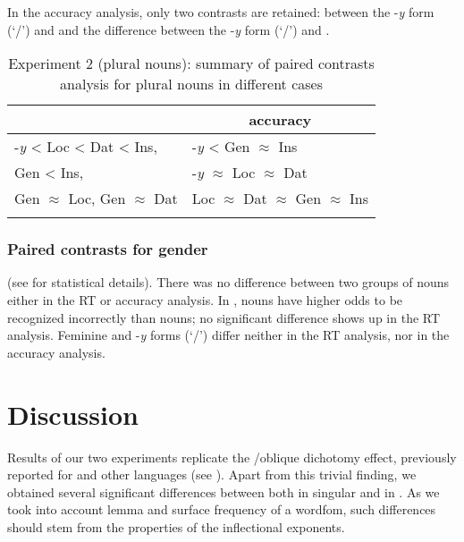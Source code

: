 \documentclass[output=paper, modfonts,newtxmath,hidelinks]{langscibook}
\begin{document}
In the accuracy analysis, only two contrasts are retained: between the -\textit{y} form (`\nomm/\accc') and  and the difference between the -\textit{y} form (`\nomm/\accc') and .

\begin{table}
    \centering
	\caption{Experiment 2 (plural nouns): summary of paired contrasts analysis for plural nouns in different cases}
    \label{tab:casePlHierarchy}
    \begin{tabular}{*{2}l}
    \lsptoprule
    \multicolumn{1}{c}{RTs}	&	\multicolumn{1}{c}{accuracy}\\
    \midrule
    -\textit{y}	< Loc < Dat < Ins,	&	-\textit{y} < Gen $\approx$ Ins \\
    Gen < Ins,	&	-\textit{y} $\approx$ Loc $\approx$ Dat\\
    Gen $\approx$ Loc, Gen $\approx$ Dat & Loc $\approx$	Dat $\approx$ Gen $\approx$  Ins\\
    \lspbottomrule
    \end{tabular}
\end{table}    

\subsubsection{Paired contrasts for gender} (see  for statistical details). There was no difference between two groups of nouns either in the RT or accuracy analysis. In ,   nouns have higher odds to be recognized incorrectly than  nouns; no significant difference shows up in the RT analysis. Feminine and  -\textit{y} forms (`\nomm/\accc') differ neither in the RT analysis, nor in the accuracy analysis. 

\section{Discussion}
Results of our two experiments replicate the \slash oblique dichotomy effect, previously reported for  and other languages (see ). Apart from this trivial finding, we obtained several significant differences between   both in singular and in . As we took into account lemma and surface frequency of a wordfom, such   differences should stem from the properties of the inflectional exponents.\\
\end{document}
